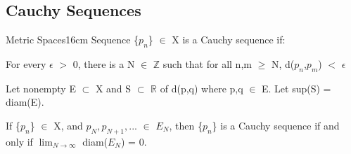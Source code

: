 \subsection{ Cauchy Sequences }

    \begin{definition}{Metric Spaces}{16cm}
        Sequence \{$p_n$\} $\in$ X is a {\color{lblue} Cauchy sequence} if:

        \hspace{0.5cm}
        For every $\epsilon$ $>$ 0, there is a N $\in$ $\mathbb{Z}$ such that
        for all n,m $\geq$ N, d($p_n$,$p_m$) $<$ $\epsilon$

        Let nonempty E $\subset$ X and S $\subset$ $\mathbb{R}$ of 
        d(p,q) where p,q $\in$ E.
        Let sup(S) = diam(E).

        If \{$p_n$\} $\in$ X, and $p_N, p_{N+1}, ... $ $\in$ $E_N$, then
        \{$p_n$\} is a Cauchy sequence if and only if
        $\lim_{N \rightarrow \infty}$ diam($E_N$) = 0.
    \end{definition}

    \newpage



